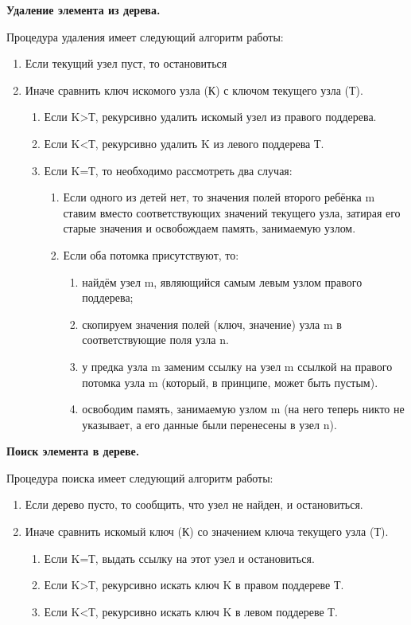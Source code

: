 {\bf Удаление элемента из дерева.}

Процедура удаления имеет следующий алгоритм работы:
\begin{enumerate}
\item Если текущий узел пуст, то остановиться
\item Иначе сравнить ключ искомого узла (К) с ключом текущего узла (Т).
\begin{enumerate}
\item Если K>Т, рекурсивно удалить искомый узел из правого поддерева.
\item Если K<Т, рекурсивно удалить K из левого поддерева Т.
\item Если K=Т, то необходимо рассмотреть два случая:
\begin{enumerate}
\item Если одного из детей нет, то значения полей второго ребёнка m ставим вместо соответствующих значений текущего узла, затирая его старые значения и освобождаем память, занимаемую узлом.
\item Если оба потомка присутствуют, то:
\begin{enumerate}
\item найдём узел m, являющийся самым левым узлом правого поддерева;
\item скопируем значения полей (ключ, значение) узла m в соответствующие поля узла n.
\item у предка узла m заменим ссылку на узел m ссылкой на правого потомка узла m (который, в принципе, может быть пустым).
\item освободим память, занимаемую узлом m (на него теперь никто не указывает, а его данные были перенесены в узел n).
\end{enumerate}
\end{enumerate}
\end{enumerate}
\end{enumerate}


{\bf Поиск элемента в дереве.}

Процедура поиска имеет следующий алгоритм работы:
\begin{enumerate}
\item Если дерево пусто, то сообщить, что узел не найден, и остановиться.
\item Иначе сравнить искомый ключ (К) со значением ключа текущего узла (Т).
\begin{enumerate}
\item Если K=Т, выдать ссылку на этот узел и остановиться.
\item Если K>Т, рекурсивно искать ключ K в правом поддереве Т.
\item Если K<Т, рекурсивно искать ключ K в левом поддереве Т.
\end{enumerate}
\end{enumerate}

